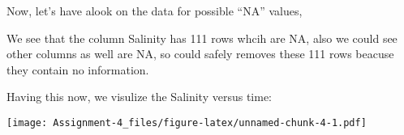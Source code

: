 \documentclass[]{article}
\newenvironment{Shaded}{\begin{snugshade}}{\end{snugshade}}
\newcommand{\DataTypeTok}[1]{\textcolor[rgb]{0.13,0.29,0.53}{#1}}
\newcommand{\KeywordTok}[1]{\textcolor[rgb]{0.13,0.29,0.53}{\textbf{#1}}}
\newcommand{\NormalTok}[1]{#1}
\newcommand{\OperatorTok}[1]{\textcolor[rgb]{0.81,0.36,0.00}{\textbf{#1}}}
\newcommand{\StringTok}[1]{\textcolor[rgb]{0.31,0.60,0.02}{#1}}
\begin{document}
Now, let's have alook on the data for possible ``NA'' values,

\begin{Shaded}
\end{Shaded}

We see that the column Salinity has 111 rows whcih are NA, also we could
see other columns as well are NA, so could safely removes these 111 rows
beacuse they contain no information.

\begin{Shaded}
\end{Shaded}

Having this now, we visulize the Salinity versus time:

\begin{Shaded}
\end{Shaded}

\texttt{[image: Assignment-4\_files/figure-latex/unnamed-chunk-4-1.pdf]}
\end{document}
